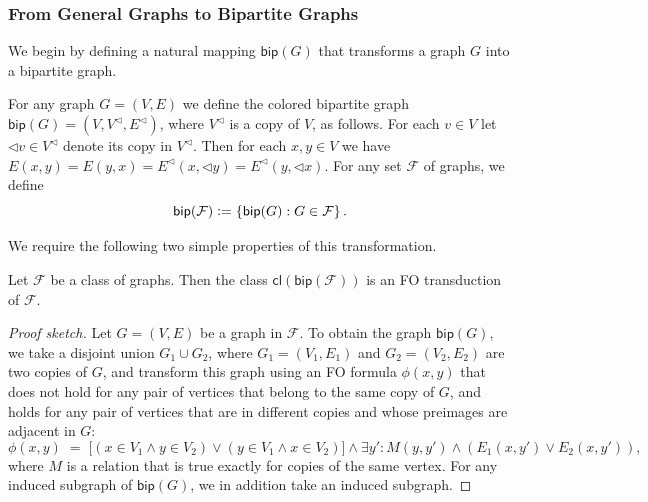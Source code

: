 \documentclass{theoretics}
\newcommand{\define}{\vcentcolon=}
\newcommand{\cF}{\ensuremath{\mathcal{F}}}
\newcommand{\bip}{\mathsf{bip}}
\newcommand{\cl}{\mathsf{cl}}
\begin{document}
\subsubsection{From General Graphs to Bipartite Graphs}\label{sec:to-bip-graphs}

We begin by defining a natural mapping $\bip(G)$ that transforms a graph $G$ into a bipartite graph.

\newcommand{\cpy}{\triangleleft}
\begin{definition}
For any graph $G = (V,E)$ we define the colored bipartite graph $\bip(G) = (V,V^\cpy,E^\cpy)$, where
$V^\cpy$ is a copy of $V$, as follows. For each $v \in V$ let $\cpy v \in V^\cpy$ denote its copy in
$V^\cpy$.  Then for each $x,y \in V$ we have $E(x,y) = E(y,x) = E^\cpy(x, \cpy y) = E^\cpy(y, \cpy x)$. For
any set $\cF$ of graphs, we define
\[
  \bip(\cF) \define \{ \bip(G) : G \in \cF \} \,.
\]
\end{definition}

We require the following two simple properties of this transformation.
\begin{proposition}\label{prop:Bip-transduction}
	Let $\cF$ be a class of graphs. Then the class $\cl(\bip(\cF))$ is an FO transduction of $\cF$.
\end{proposition}
\begin{proof}[Proof sketch]
	Let $G=(V,E)$ be a graph in $\cF$. To obtain the graph $\bip(G)$, we take a disjoint union $G_1 \cup G_2$, where
	$G_1=(V_1,E_1)$ and $G_2 = (V_2, E_2)$ are two copies of $G$,
	and transform this graph using an FO formula $\phi(x,y)$ that does not hold for any pair of vertices 
	that belong to the same copy of $G$, and holds for any pair of vertices that are in different copies and whose
	preimages are adjacent in $G$:
	$$
		\phi(x,y) \;=\; \bigl[(x \in V_1 \wedge y \in V_2) \vee (y \in V_1 \wedge x \in V_2)\bigr] 
		\wedge \exists y' : M(y,y') \wedge (E_1(x,y') \vee E_2(x,y')),
	$$
	where $M$ is a relation that is true exactly for copies of the same vertex.
	For any induced subgraph of $\bip(G)$, we in addition take an induced subgraph.
\end{proof}
\end{document}
